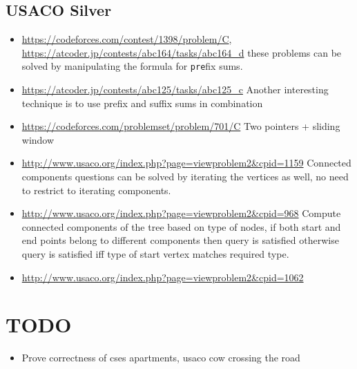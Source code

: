 \documentclass[titlepage, 12pt]{book}
\begin{document}
\subsection{USACO Silver}
\begin{itemize}
  \item\url{https://codeforces.com/contest/1398/problem/C},
    \url{https://atcoder.jp/contests/abc164/tasks/abc164_d} these problems can
    be solved by manipulating the formula for \verb|pre|fix sums.
  \item\url{https://atcoder.jp/contests/abc125/tasks/abc125_c} Another
    interesting technique is to use prefix and suffix sums in combination
  \item\url{https://codeforces.com/problemset/problem/701/C} Two pointers +
    sliding window
  \item\url{http://www.usaco.org/index.php?page=viewproblem2&cpid=1159}
    Connected components questions can be solved by iterating the vertices as
    well, no need to restrict to iterating components.
  \item\url{http://www.usaco.org/index.php?page=viewproblem2&cpid=968} Compute
    connected components of the tree based on type of nodes, if both start and
    end points belong to different components then query is satisfied otherwise
    query is satisfied iff type of start vertex matches required type.
  \item\url{http://www.usaco.org/index.php?page=viewproblem2&cpid=1062}
\end{itemize}

\section{TODO}
\begin{itemize}
  \item Prove correctness of cses apartments, usaco cow crossing the road
\end{itemize}
\end{document}
